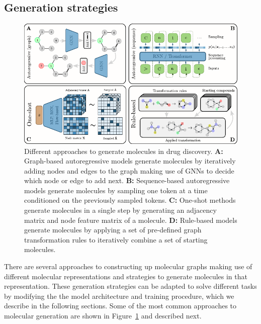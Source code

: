 \subsection{Generation strategies}
\begin{figure}
      \centering
      \includegraphics[width=\textwidth]{figures/generation_strategies_tryout.pdf}
      \caption{Different approaches to generate molecules in drug discovery. \textbf{A:} Graph-based
            autoregressive models generate molecules by iteratively adding nodes and edges to the graph
            making use of \acp{GNN} to decide which node or edge to add next. \textbf{B:}
            Sequence-based autoregressive models generate molecules by sampling one token at a time
            conditioned on the previously sampled tokens. \textbf{C:} One-shot methods generate molecules
            in a single step by generating an adjacency matrix and node feature matrix of a molecule.
            \textbf{D:} Rule-based models generate molecules by applying a set of pre-defined graph
            transformation rules to iteratively combine a set of starting molecules.
            \label{fig:generation-strategies}}
\end{figure}
There are several approaches to constructing up molecular graphs making use of different molecular
representations and strategies to generate molecules in that representation. These generation
strategies can be adapted to solve different tasks by modifying the the model architecture and
training procedure, which we describe in the following sections. Some of the most common approaches
to molecular generation  are shown in Figure~\ref{fig:generation-strategies} and described next.

